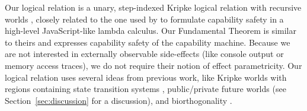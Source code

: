 \documentclass[format=acmsmall, review=true, screen=true]{acmart}
\renewcommand{\sectionname}{Section}
\newcommand\lau[1]{{\color{purple} \sf \footnotesize {LS: #1}}\\}
\renewcommand\lau[1]{}
\begin{document}
\lau{Reviewer C, esop, would like a better comparison with \citet{Devriese:2016ObjCap} (but also admits that they did not follow the below discussion).}
Our logical relation is a unary, step-indexed Kripke logical relation with
recursive worlds
\citep{pitts_operational_1998,Appel:2001:IMR:504709.504712,Ahmed2004semantics,Birkedal:2011:SKM:1926385.1926401},
closely related to the one used by \citet{Devriese:2016ObjCap} to formulate
capability safety in a high-level JavaScript-like lambda calculus. Our
Fundamental Theorem is similar to theirs and expresses capability safety of the
capability machine. Because we are not interested in externally observable
side-effects (like console output or memory access traces), we do not require
their notion of effect parametricity. Our logical relation uses several ideas
from previous work, like Kripke worlds with regions containing state transition
systems \citep{Ahmed:popl09}, public/private future worlds \citep{Dreyer:jfp12}
(see \sectionname~\ref{sec:discussion} for a discussion), and biorthogonality
\citep{pitts_operational_1998,benton_biorthogonality_2009-1,Hur:2011:KLR:1926385.1926402}.
\end{document}
